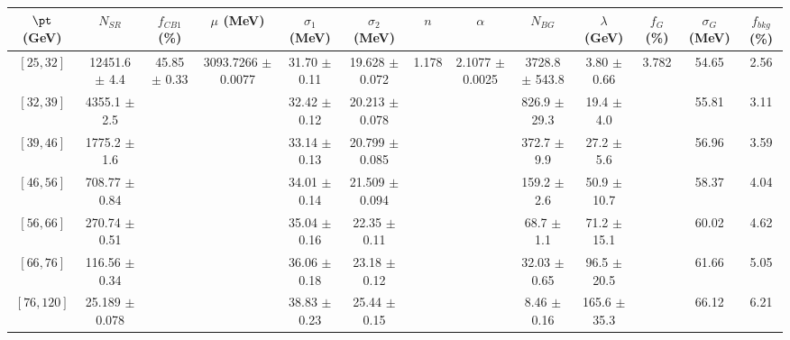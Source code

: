 \begin{tabular}{c||c|c|c|c|c|c|c|c|c|c|c||c}
$\pt$ (GeV) & $N_{SR}$ & $f_{CB1}$ (\%) & $\mu$ (MeV) & $\sigma_1$ (MeV) & $\sigma_2$ (MeV) & $n$ & $\alpha$ & $N_{BG}$ & $\lambda$ (GeV) & $f_G$ (\%) & $\sigma_G$ (MeV) & $f_{bkg}$ (\%) \\
\hline
$[25, 32]$ & 12451.6 $\pm$ 4.4 & \multirow{7}{*}{45.85 $\pm$ 0.33} & \multirow{7}{*}{3093.7266 $\pm$ 0.0077} & 31.70 $\pm$ 0.11 & 19.628 $\pm$ 0.072 & \multirow{7}{*}{1.178} & \multirow{7}{*}{2.1077 $\pm$ 0.0025} & 3728.8 $\pm$ 543.8 & 3.80 $\pm$ 0.66 & \multirow{7}{*}{3.782} & 54.65 & 2.56\\
$[32, 39]$ & 4355.1 $\pm$ 2.5 &  &  & 32.42 $\pm$ 0.12 & 20.213 $\pm$ 0.078 &  &  & 826.9 $\pm$ 29.3 & 19.4 $\pm$ 4.0 &  & 55.81 & 3.11\\
$[39, 46]$ & 1775.2 $\pm$ 1.6 &  &  & 33.14 $\pm$ 0.13 & 20.799 $\pm$ 0.085 &  &  & 372.7 $\pm$ 9.9 & 27.2 $\pm$ 5.6 &  & 56.96 & 3.59\\
$[46, 56]$ & 708.77 $\pm$ 0.84 &  &  & 34.01 $\pm$ 0.14 & 21.509 $\pm$ 0.094 &  &  & 159.2 $\pm$ 2.6 & 50.9 $\pm$ 10.7 &  & 58.37 & 4.04\\
$[56, 66]$ & 270.74 $\pm$ 0.51 &  &  & 35.04 $\pm$ 0.16 & 22.35 $\pm$ 0.11 &  &  & 68.7 $\pm$ 1.1 & 71.2 $\pm$ 15.1 &  & 60.02 & 4.62\\
$[66, 76]$ & 116.56 $\pm$ 0.34 &  &  & 36.06 $\pm$ 0.18 & 23.18 $\pm$ 0.12 &  &  & 32.03 $\pm$ 0.65 & 96.5 $\pm$ 20.5 &  & 61.66 & 5.05\\
$[76, 120]$ & 25.189 $\pm$ 0.078 &  &  & 38.83 $\pm$ 0.23 & 25.44 $\pm$ 0.15 &  &  & 8.46 $\pm$ 0.16 & 165.6 $\pm$ 35.3 &  & 66.12 & 6.21\\
\end{tabular}
